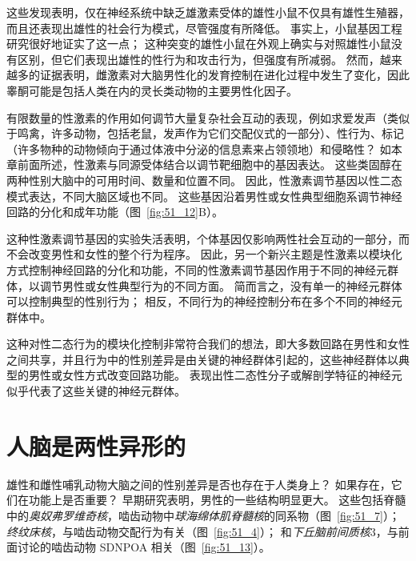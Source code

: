 这些发现表明，仅在神经系统中缺乏雄激素受体的雄性小鼠不仅具有雄性生殖器，而且还表现出雄性的社会行为模式，尽管强度有所降低。
事实上，小鼠基因工程研究很好地证实了这一点；
这种突变的雄性小鼠在外观上确实与对照雄性小鼠没有区别，但它们表现出雄性的性行为和攻击行为，但强度有所减弱。
然而，越来越多的证据表明，雌激素对大脑男性化的发育控制在进化过程中发生了变化，因此睾酮可能是包括人类在内的灵长类动物的主要男性化因子。


有限数量的性激素的作用如何调节大量复杂社会互动的表现，例如求爱发声（类似于鸣禽，许多动物，包括老鼠，发声作为它们交配仪式的一部分）、性行为、标记 （许多物种的动物倾向于通过体液中分泌的信息素来占领领地）和侵略性？
如本章前面所述，性激素与同源受体结合以调节靶细胞中的基因表达。
这些类固醇在两种性别大脑中的可用时间、数量和位置不同。
因此，性激素调节基因以性二态模式表达，不同大脑区域也不同。
这些基因沿着男性或女性典型细胞系调节神经回路的分化和成年功能（图~\ref{fig:51_12}B）。


这种性激素调节基因的实验失活表明，个体基因仅影响两性社会互动的一部分，而不会改变男性和女性的整个行为程序。
因此，另一个新兴主题是性激素以模块化方式控制神经回路的分化和功能，不同的性激素调节基因作用于不同的神经元群体，以调节男性或女性典型行为的不同方面。
简而言之，没有单一的神经元群体可以控制典型的性别行为；
相反，不同行为的神经控制分布在多个不同的神经元群体中。


这种对性二态行为的模块化控制非常符合我们的想法，即大多数回路在男性和女性之间共享，并且行为中的性别差异是由关键的神经群体引起的，这些神经群体以典型的男性或女性方式改变回路功能。
表现出性二态性分子或解剖学特征的神经元似乎代表了这些关键的神经元群体。



\section{人脑是两性异形的}

雄性和雌性哺乳动物大脑之间的性别差异是否也存在于人类身上？
如果存在，它们在功能上是否重要？
早期研究表明，男性的一些结构明显更大。
这些包括脊髓中的\textit{奥奴弗罗维奇核}，啮齿动物中\textit{球海绵体肌脊髓核}的同系物（图~\ref{fig:51_7}）；
\textit{终纹床核}，与啮齿动物交配行为有关（图~\ref{fig:51_4}）；
和\textit{下丘脑前间质核}3，与前面讨论的啮齿动物 SDNPOA 相关（图~\ref{fig:51_13}）。


